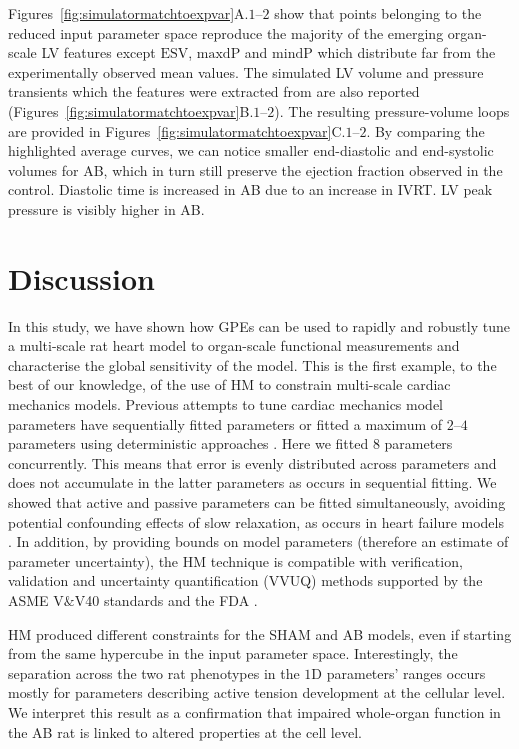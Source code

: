 \vspace{0.2cm}\noindent
Figures~\ref{fig:simulatormatchtoexpvar}A.$1$--$2$ show that points belonging to the reduced input parameter space reproduce the majority of the emerging organ-scale LV features except $\textrm{ESV}$, $\textrm{maxdP}$ and $\textrm{mindP}$ which distribute far from the experimentally observed mean values. The simulated LV volume and pressure transients which the features were extracted from are also reported (Figures~\ref{fig:simulatormatchtoexpvar}B.$1$--$2$). The resulting pressure-volume loops are provided in Figures~\ref{fig:simulatormatchtoexpvar}C.$1$--$2$.
By comparing the highlighted average curves, we can notice smaller end-diastolic and end-systolic volumes for AB, which in turn still preserve the ejection fraction observed in the control. Diastolic time is increased in AB due to an increase in IVRT. LV peak pressure is visibly higher in AB.


%
%
%
\section{Discussion}\label{sec:ch4discussion}

\noindent
In this study, we have shown how GPEs can be used to rapidly and robustly tune a multi-scale rat heart model to organ-scale functional measurements and characterise the global sensitivity of the model. This is the first example, to the best of our knowledge, of the use of HM to constrain multi-scale cardiac mechanics models. Previous attempts to tune cardiac mechanics model parameters have sequentially fitted parameters \cite{Wang:2009} or fitted a maximum of $2$--$4$ parameters using deterministic approaches \cite{Lewalle:2018}. Here we fitted $8$ parameters concurrently. This means that error is evenly distributed across parameters and does not accumulate in the latter parameters as occurs in sequential fitting. We showed that active and passive parameters can be fitted simultaneously, avoiding potential confounding effects of slow relaxation, as occurs in heart failure models \cite{Xi:2013}. In addition, by providing bounds on model parameters (therefore an estimate of parameter uncertainty), the HM technique is compatible with verification, validation and uncertainty quantification (VVUQ) methods \cite{Patten:2009} supported by the ASME V$\&$V40 standards and the FDA \cite{Asme:2019}.

HM produced different constraints for the SHAM and AB models, even if starting from the same hypercube in the input parameter space. Interestingly, the separation across the two rat phenotypes in the $1$D parameters' ranges occurs mostly for parameters describing active tension development at the cellular level. We interpret this result as a confirmation that impaired whole-organ function in the AB rat is linked to altered properties at the cell level.

